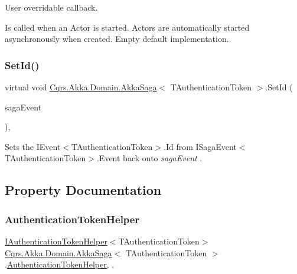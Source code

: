 User overridable callback. 

Is called when an Actor is started. Actors are automatically started asynchronously when created. Empty default implementation. 

\mbox{\label{classCqrs_1_1Akka_1_1Domain_1_1AkkaSaga_a3f3cf1a10203a1eead599e7529d41613_a3f3cf1a10203a1eead599e7529d41613}} 
\subsubsection{\texorpdfstring{Set\+Id()}{SetId()}}
{\footnotesize\ttfamily virtual void \hyperlink{classCqrs_1_1Akka_1_1Domain_1_1AkkaSaga}{Cqrs.\+Akka.\+Domain.\+Akka\+Saga}$<$ T\+Authentication\+Token $>$.Set\+Id (\begin{DoxyParamCaption}\item[{\hyperlink{interfaceCqrs_1_1Events_1_1ISagaEvent}{I\+Saga\+Event}$<$ T\+Authentication\+Token $>$}]{saga\+Event }\end{DoxyParamCaption})\hspace{0.3cm}{\ttfamily [protected]}, {\ttfamily [virtual]}}



Sets the I\+Event$<$\+T\+Authentication\+Token$>$.\+Id from I\+Saga\+Event$<$\+T\+Authentication\+Token$>$.\+Event back onto {\itshape saga\+Event} . 



\subsection{Property Documentation}
\mbox{\label{classCqrs_1_1Akka_1_1Domain_1_1AkkaSaga_a18e4d7faa9cd9d10ac2ac0bd3b6c9fc9_a18e4d7faa9cd9d10ac2ac0bd3b6c9fc9}} 
\subsubsection{\texorpdfstring{Authentication\+Token\+Helper}{AuthenticationTokenHelper}}
{\footnotesize\ttfamily \hyperlink{interfaceCqrs_1_1Authentication_1_1IAuthenticationTokenHelper}{I\+Authentication\+Token\+Helper}$<$T\+Authentication\+Token$>$ \hyperlink{classCqrs_1_1Akka_1_1Domain_1_1AkkaSaga}{Cqrs.\+Akka.\+Domain.\+Akka\+Saga}$<$ T\+Authentication\+Token $>$.\hyperlink{classCqrs_1_1Authentication_1_1AuthenticationTokenHelper}{Authentication\+Token\+Helper}\hspace{0.3cm}{\ttfamily [get]}, {\ttfamily [set]}, {\ttfamily [protected]}}



